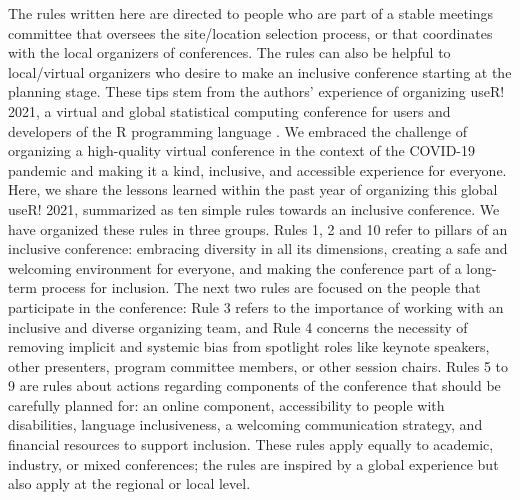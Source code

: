 \documentclass[10pt,letterpaper]{article}
\begin{document}
The rules written here are directed to people who are part of a stable meetings committee that oversees the site/location selection process, or that coordinates with the local organizers of conferences.
The rules can also be helpful to local/virtual organizers who desire to make an inclusive conference starting at the planning stage.
These tips stem from the authors' experience of organizing useR! 2021, a virtual and global statistical computing conference for users and developers of the R programming language \cite{r_core_team_2021}. 
We embraced the challenge of organizing a high-quality virtual conference in the context of the COVID-19 pandemic and making it a kind, inclusive, and accessible experience for everyone. 
Here, we share the lessons learned within the past year of organizing this global useR! 2021, summarized as ten simple rules towards an inclusive conference.
We have organized these rules in three groups.
Rules 1, 2 and 10 refer to pillars of an inclusive conference: embracing diversity in all its dimensions, creating a safe and welcoming environment for everyone, and making the conference part of a long-term process for inclusion.
The next two rules are focused on the people that participate in the conference: 
Rule 3 refers to the importance of working with an inclusive and diverse organizing team, and Rule 4 concerns the necessity of removing implicit and systemic bias from spotlight roles like keynote speakers, other presenters, program committee members, or other session chairs. 
Rules 5 to 9 are rules about actions regarding components of the conference that should be carefully planned for: an online component, accessibility to people with disabilities, language inclusiveness, a welcoming communication strategy, and financial resources to support inclusion. 
These rules apply equally to academic, industry, or mixed conferences; the rules are inspired by a global experience but also apply at the regional or local level.

\end{document}
